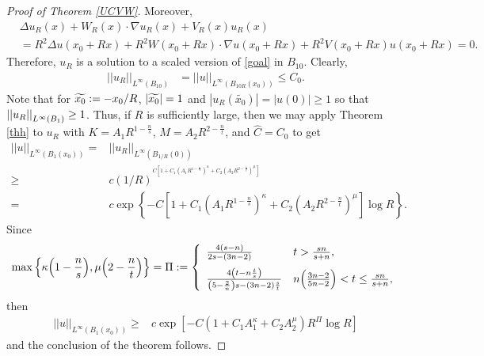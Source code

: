 \documentclass[11pt]{amsart}
\theoremstyle{plain}
\numberwithin{equation}{section}
\begin{document}
\begin{proof}[Proof of Theorem \ref{UCVW}]
Moreover,
\begin{align*}
& {\Delta} u_R{\left( {x} \right) } + W_R{\left( {x} \right) } \cdot {\nabla} u_R{\left( {x} \right) }  + V_R{\left( {x} \right) } u_R{\left( {x} \right) } \\
&= R^2 {\Delta} u{\left( {x_0 + R x} \right) } + R^2 W{\left( {x_0 + Rx} \right) } \cdot {\nabla} u{\left( {x_0 + R x} \right) }  + R^2 V{\left( {x_0 + R x} \right) }u{\left( {x_0 + R x} \right) }
= 0.
\end{align*}
Therefore, $u_R$ is a solution to a scaled version of \eqref{goal} in $B_{10}$.
Clearly,
\begin{align*}
{\left\vert\left\vert {u_R}\right\vert\right\vert}_{L^{\infty}{\left( {B_{10}} \right) }}
&= {\left\vert\left\vert {u}\right\vert\right\vert}_{L^{\infty}{\left( {B_{10R}{\left( {x_0} \right) }} \right) }} \le C_0.
\end{align*}
Note that for ${\displaystyle}\widetilde{x_0} := -x_0/R$, ${\displaystyle}| \widetilde{x_0}| = 1$ and ${\left\vert{u_R(\widetilde{x_0})}\right\vert} = {\left\vert{u(0)}\right\vert} \ge 1$ so that ${\displaystyle}{\left\vert\left\vert {u_R}\right\vert\right\vert}_{L^{\infty}(B_1)} \ge 1$.
Thus, if $R$ is sufficiently large, then we may apply Theorem \ref{thh} to $u_R$ with $K = A_1 R^{1 - \frac n s}$, $M = A_2 R^{2 - \frac n t}$, and $\hat C = C_0$ to get
\begin{align*}
{\left\vert\left\vert {u}\right\vert\right\vert}_{L^{\infty}{\left( {{B_{1}(x_0)}} \right) }} = & {\left\vert\left\vert {u_R}\right\vert\right\vert}_{L^{\infty}{\left( {B_{1/R}(0)} \right) }}  \\
\ge & c(1/R)^{^{C{\left[{1 + C_1 {\left( {A_1 R^{1 - \frac n s}} \right) }^\kappa + C_2 {\left( {A_2 R^{2 - \frac n t} } \right) }^\mu}\right]}}} \\
= &c \exp{\left\{{-C{\left[{1 + C_1 {\left( {A_1 R^{1 - \frac n s}} \right) }^\kappa + C_2 {\left( {A_2 R^{2 - \frac n t} } \right) }^\mu}\right]} \log R}\right\}}.
\end{align*}
Since
\begin{align*}
\max{\left\{{\kappa{\left( {1 - \frac n s} \right) }, \mu{\left( {2 - \frac n t} \right) } }\right\}}= \Pi := \left\{\begin{array}{ll}
\frac{4{\left( {s-n} \right) }}{2s - {\left( {3n-2} \right) }} & t > \frac{sn}{s+n}, \medskip \\
\frac{4 {\left( {t-n\frac t s} \right) }}{{\left( {5 - \frac 2 n} \right) }s - {\left( {3n-2} \right) } \frac s
t} & n{\left( {\frac{3n-2}{5n-2}} \right) } < t \le \frac{sn}{s+n},
\end{array}\right.
\end{align*}
then
\begin{align*}
{\left\vert\left\vert {u}\right\vert\right\vert}_{L^{\infty}{\left( {{B_{1}(x_0)}} \right) }}
\ge &c \exp{\left[{-C{\left( {1 + C_1 A_1^\kappa + C_2 A_2^\mu } \right) } R^\Pi \log R}\right]}
\end{align*}
and the conclusion of the theorem follows.
\end{proof}
\end{document}
